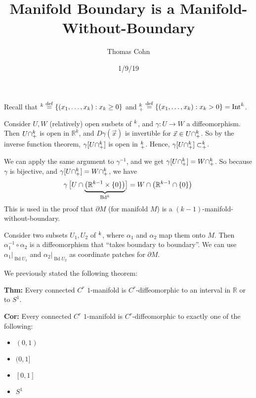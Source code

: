 \documentclass[10pt,letterpaper]{article}
\author{Thomas Cohn}
\title{Manifold Boundary is a Manifold-Without-Boundary}
\date{1/9/19} %
\newcommand{\n}{\hfill\break}
\newcommand{\thm}[1]{\par\noindent\settowidth{\hangindent}{\textbf{Thm: }}\textbf{Thm: }#1\n}
\newcommand{\cor}[1]{\par\noindent\settowidth{\hangindent}{\textbf{Cor: }}\textbf{Cor: }#1\n}
\newcommand{\ptxt}[1]{\textrm{\textnormal{#1}}}
\newcommand{\set}[1]{\left\{#1\right\}}
\newcommand{\reals}{\mathbb{R}}
\newcommand{\R}{\reals}
\newcommand{\halfPlane}{\mathbb{H}}
\let\H\relax
\newcommand{\H}{\halfPlane}
\newcommand{\inv}{^{-1}}
\newcommand{\of}{\circ}
\DeclareMathOperator{\Int}{Int}
\DeclareMathOperator{\Bd}{Bd}
\newcommand{\eqdef}{\overset{\ptxt{def}}{=}}
\newcommand{\paren}[1]{\left(#1\right)}
\renewcommand{\brack}[1]{\left[#1\right]}
\begin{document}
\maketitle
\setlength\RaggedRightParindent{\parindent}
\RaggedRight

\par\noindent Recall that $\H^{k}\eqdef\set{(x_{1},\ldots,x_{k}):x_{k}\ge{}0}$ and $\H^{k}_{+}\eqdef\set{(x_{1},\ldots,x_{k}):x_{k}>0}=\Int\H^{k}$.\n

\par\noindent Consider $U,W$ (relatively) open susbets of $\H^{k}$, and $\gamma:U\to{}W$ a diffeomorphism.\n
Then $U\cap\H^{k}_{+}$ is open in $\R^{k}$, and $D\gamma(\vec{x})$ is invertible for $\vec{x}\in{}U\cap\H^{k}_{+}$.\n
So by the inverse function theorem, $\gamma[U\cap\H^{k}_{+}]$ is open in $\H^{k}_{+}$. Hence, $\gamma[U\cap\H^{k}_{+}]\subset\H^{k}_{+}$.\n

\par\noindent We can apply the same argument to $\gamma\inv$, and we get $\gamma[U\cap\H^{k}_{+}]=W\cap\H^{k}_{+}$. So because $\gamma$ is bijective, and $\gamma[U\cap\H^{k}_{+}]=W\cap\H^{k}_{+}$, we have
\[
\gamma\brack{\vphantom{\paren{\R^{k-1}}}U\cap\smash{\underbrace{\paren{\R^{k-1}\times\set{0}}}_{\Bd\H^{k}}}}=W\cap\paren{\R^{k-1}\cap\set{0}}
\vphantom{\underbrace{A}_{B}}
\]

\par\noindent This is used in the proof that $\partial{}M$ (for manifold $M$) is a $(k-1)$-manifold-without-boundary.\n

\par\noindent Consider two subsets $U_{1},U_{2}$ of $\H^{k}$, where $\alpha_{1}$ and $\alpha_{2}$ map them onto $M$. Then $\alpha_{1}\inv\of\alpha_{2}$ is a diffeomorphism that ``takes boundary to boundary''. We can use $\alpha_{1}|_{\Bd{}U_{1}}$ and $\alpha_{2}|_{\Bd{}U_{2}}$ as coordinate patches for $\partial{}M$.\n

\par\noindent We previously stated the following theorem:\n
\thm{Every connected $C^{r}$ $1$-manifold is $C^{r}$-diffeomorphic to an interval in $\R$ or to $S^{1}$.}
\cor{Every connected $C^{r}$ $1$-manifold is $C^{r}$-diffeomorphic to exactly one of the following:
\begin{itemize}
	\item $(0,1)$
	\item $(0,1]$
	\item $[0,1]$
	\item $S^{1}$
\end{itemize}}
\end{document}

